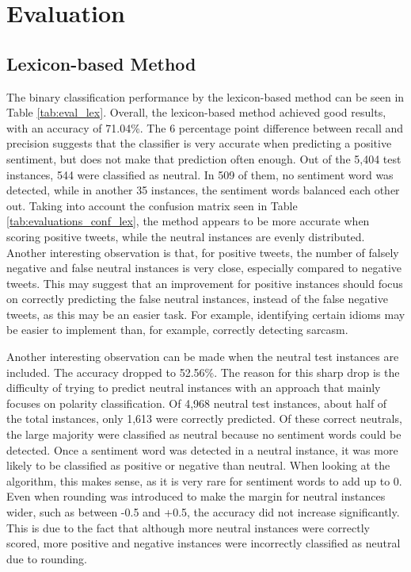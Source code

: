 \chapter{Evaluation}
\section{Lexicon-based Method}

The binary classification performance by the lexicon-based method can be seen in Table \ref{tab:eval_lex}. Overall, the lexicon-based method achieved good results, with an accuracy of 71.04\%. The 6 percentage point difference between recall and precision suggests that the classifier is very accurate when predicting a positive sentiment, but does not make that prediction often enough. Out of the 5,404 test instances, 544 were classified as neutral. In 509 of them, no sentiment word was detected, while in another 35 instances, the sentiment words balanced each other out. Taking into account the confusion matrix seen in Table \ref{tab:evaluations_conf_lex}, the method appears to be more accurate when scoring positive tweets, while the neutral instances are evenly distributed. Another interesting observation is that, for positive tweets, the number of falsely negative and false neutral instances is very close, especially compared to negative tweets. This may suggest that an improvement for positive instances should focus on correctly predicting the false neutral instances, instead of the false negative tweets, as this may be an easier task. For example, identifying certain idioms may be easier to implement than, for example, correctly detecting sarcasm.

Another interesting observation can be made when the neutral test instances are included. The accuracy dropped to 52.56\%. The reason for this sharp drop is the difficulty of trying to predict neutral instances with an approach that mainly focuses on polarity classification. Of 4,968 neutral test instances, about half of the total instances, only 1,613 were correctly predicted. Of these correct neutrals, the large majority were classified as neutral because no sentiment words could be detected. Once a sentiment word was detected in a neutral instance, it was more likely to be classified as positive or negative than neutral. When looking at the algorithm, this makes sense, as it is very rare for sentiment words to add up to 0. Even when rounding was introduced to make the margin for neutral instances wider, such as between -0.5 and +0.5, the accuracy did not increase significantly. This is due to the fact that although more neutral instances were correctly scored, more positive and negative instances were incorrectly classified as neutral due to rounding.

